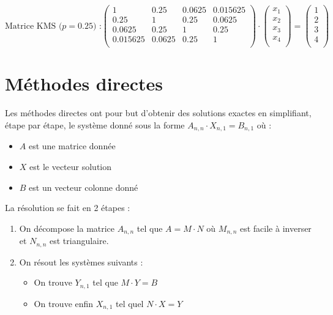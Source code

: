 \documentclass{report}
\begin{document}
        \begin{equation}
        \text{Matrice KMS (}
        p=0.25\text{) :}
        \begin{pmatrix}
          1 & 0.25 & 0.0625 & 0.015625 \\
          0.25 & 1 & 0.25 & 0.0625 \\
          0.0625 & 0.25 & 1 & 0.25 \\
          0.015625 & 0.0625 & 0.25 & 1 \\
        \end{pmatrix}
        \cdot
        \begin{pmatrix}
          x_1 \\
          x_2 \\
          x_3 \\
          x_4 \\
        \end{pmatrix}
        =
        \begin{pmatrix}
          1 \\
          2 \\
          3 \\
          4 \\
        \end{pmatrix}
        \label{syst10}
        \end{equation}

	  
  \chapter{Méthodes directes}
    Les méthodes directes ont pour but d'obtenir des solutions exactes en simplifiant, étape par étape, le système donné sous la forme 
    $A_{n,n} \cdot X_{n,1} = B_{n,1}$ où :
    \begin{itemize}
     \item{$A$ est une matrice donnée}
     \item{$X$ est le vecteur solution}
     \item{$B$ est un vecteur colonne donné}
    \end{itemize}
	\vspace{0.3cm}    
    La résolution se fait en 2 étapes :
    \begin{enumerate}
     \item{On décompose la matrice $A_{n,n}$ tel que $A = M \cdot N$ où $M_{n,n}$ est facile à inverser et $N_{n,n}$ est triangulaire.}
     \item{On résout les systèmes suivants : 
           \begin{itemize}
            \item{On trouve $Y_{n,1}$ tel que $M \cdot Y = B$}
            \item{On trouve enfin $X_{n,1} $ tel quel $N \cdot X = Y$}
           \end{itemize}
           }
    \end{enumerate}
\end{document}

